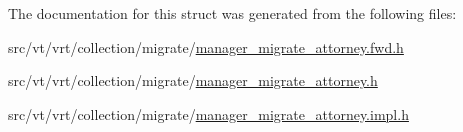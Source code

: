 The documentation for this struct was generated from the following files\+:\begin{DoxyCompactItemize}
\item 
src/vt/vrt/collection/migrate/\hyperlink{manager__migrate__attorney_8fwd_8h}{manager\+\_\+migrate\+\_\+attorney.\+fwd.\+h}\item 
src/vt/vrt/collection/migrate/\hyperlink{manager__migrate__attorney_8h}{manager\+\_\+migrate\+\_\+attorney.\+h}\item 
src/vt/vrt/collection/migrate/\hyperlink{manager__migrate__attorney_8impl_8h}{manager\+\_\+migrate\+\_\+attorney.\+impl.\+h}\end{DoxyCompactItemize}
